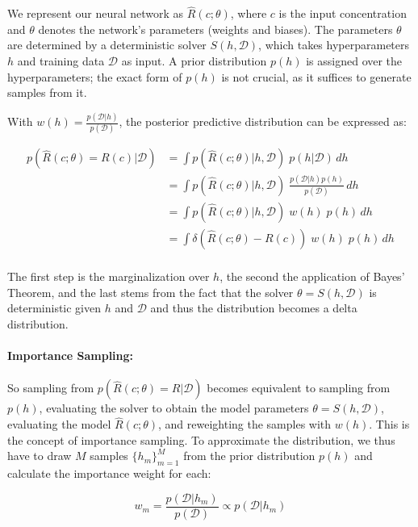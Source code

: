 We represent our neural network as $\hat{R}(c; \theta)$, where $c$ is the input concentration and $\theta$ denotes the network's parameters (weights and biases). The parameters $\theta$ are determined by a deterministic solver $S(h, \mathcal{D})$, which takes hyperparameters $h$ and training data $\mathcal{D}$ as input. A prior distribution $p(h)$ is assigned over the hyperparameters; the exact form of $p(h)$ is not crucial, as it suffices to generate samples from it.

With $w(h) = \frac{p(\mathcal{D} | h)}{p(\mathcal{D})}$, the posterior predictive distribution can be expressed as:

\begin{align*}
p(\hat{R}(c; \theta) = R(c)| \mathcal{D}) &= \int p(\hat{R}(c; \theta) | h, \mathcal{D})\; p(h | \mathcal{D}) \, dh \\
                                          &= \int p(\hat{R}(c; \theta) | h, \mathcal{D})\; \frac{p(\mathcal{D} | h) p(h)}{p(\mathcal{D})} \, dh \\
                                          &= \int p(\hat{R}(c; \theta) | h, \mathcal{D})\; w(h)\; p(h) \, dh \\
                                          &= \int \delta(\hat{R}(c; \theta) - R(c))\; w(h)\; p(h) \, dh \\
\end{align*}

The first step is the marginalization over $h$, the second the application of Bayes' Theorem, and the last stems from the fact that the solver $\theta = S(h, \mathcal{D})$ is deterministic given $h$ and $\mathcal{D}$ and thus the distribution becomes a delta distribution.


\paragraph{Importance Sampling:}

So sampling from $p(\hat{R}(c; \theta) = R| \mathcal{D})$ becomes equivalent to sampling from $p(h)$, evaluating the solver to obtain the model parameters $\theta = S(h, \mathcal{D})$, evaluating the model $\hat{R}(c; \theta)$, and reweighting the samples with $w(h)$. This is the concept of importance sampling. To approximate the distribution, we thus have to draw $M$ samples $\{h_m\}_{m=1}^M$ from the prior distribution $p(h)$ and calculate the importance weight for each:

\begin{equation*}
w_m = \frac{p(\mathcal{D} | h_m)}{p(\mathcal{D})} \propto p(\mathcal{D} | h_m)
\end{equation*}

